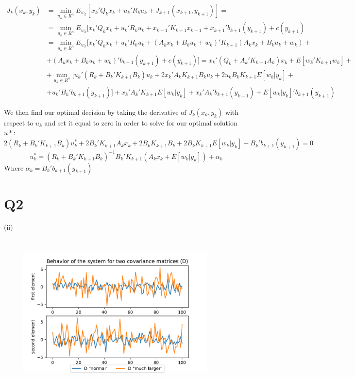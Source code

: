 \documentclass[11pt, english]{article}
\begin{document}
\begin{align*}
	J_k(x_k, y_k) &=  \min_{u_k \in R^n}E_{w_k}[x_k'Q_kx_k + u_k'R_ku_k + J_{k+1}(x_{k+1}, y_{k+1})]=\\
	& = \min_{u_k \in R^n}E_{w_k}[x_k'Q_kx_k + u_k'R_ku_k + x_{k+1}'K_{k+1}x_{k+1} + x_{k+1}'b_{k+1}(y_{k+1}) + c(y_{k+1})\\
	&= \min_{u_k \in R^n}E_{w_k}[x_k'Q_kx_k + u_k'R_ku_k + (A_kx_k + B_ku_k + w_k)'K_{k+1}(A_kx_k + B_ku_k + w_k) +\\
	&+ (A_kx_k + B_ku_k + w_k)'b_{k+1}(y_{k+1}) + c(y_{k+1})]= x_k'(Q_k + A_k'K_{k+1}A_k)x_k + E[w_k'K_{k+1}w_k] +\\
	&+ \min_{u_k \in R^n}[u_k'(R_k + B_k'K_{k+1}B_k)u_k + 2x_k'A_kK_{k+1}B_ku_k + 2u_kB_kK_{k+1}E[w_k|y_k] +\\
	&+ u_k'B_k'b_{k+1}(y_{k+1})] + x_k'A_k'K_{k+1}E[w_k|y_k] + x_k'A_k'b_{k+1}(y_{k+1}) + E[w_k|y_k]'b_{k+1}(y_{k+1})
\end{align*}


We then find our optimal decision by taking the derivative of $J_k(x_k, y_k)$ with respect to $u_k$ and set it equal to zero in order to solve for our optimal solution $u*$:
$$2(R_k + B_k'K_{k+1}B_k)u_k^* + 2B_k'K_{k+1}A_kx_k + 2B_kK_{k+1}B_k + 2B_kK_{k+1}E[w_k|y_k] + B_k'b_{k+1}(y_{k+1}) = 0$$
$$u_k^* = (R_k + B_k'K_{k+1}B_k)^{-1}B_k'K_{k+1}(A_kx_k + E[w_k|y_k]) + \alpha_k$$
Where $\alpha_k = B_k'b_{k+1}(y_{k+1})$
\newpage
\section*{Q2}

(ii)\\
\begin{center}
	\begin{figure}[h]\small
		\centering
		\includegraphics[height=8cm,width=10cm, page=1]{figures}
	\end{figure}
\end{center}
\end{document}

